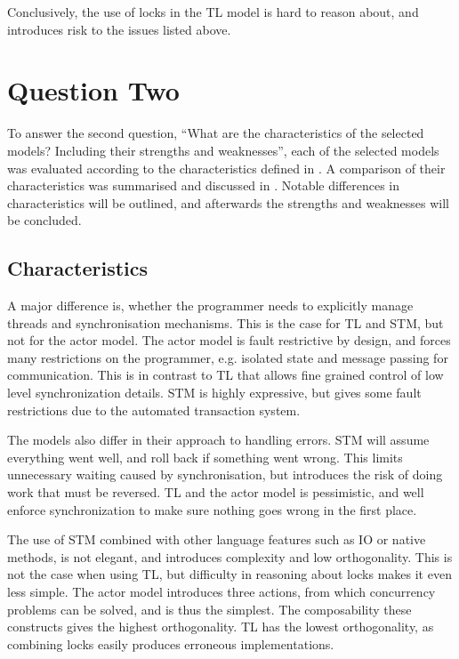 Conclusively, the use of locks in the \ac{TL} model is hard to reason about, and introduces risk to the issues listed above. 

\section{Question Two}
To answer the second question, ``What are the characteristics of the selected models? Including their strengths and weaknesses'', each of the selected models was evaluated according to the characteristics defined in . A comparison of their characteristics was summarised and discussed in . Notable differences in characteristics will be outlined, and afterwards the strengths and weaknesses will be concluded.

\subsection{Characteristics}
A major difference is, whether the programmer needs to explicitly manage threads and synchronisation mechanisms. This is the case for \ac{TL} and \ac{STM}, but not for the actor model. The actor model is fault restrictive by design, and forces many restrictions on the programmer, e.g. isolated state and message passing for communication. This is in contrast to \ac{TL} that allows fine grained control of low level synchronization details. \ac{STM} is highly expressive, but gives some fault restrictions due to the automated transaction system. 

The models also differ in their approach to handling errors. \ac{STM} will assume everything went well, and roll back if something went wrong. This limits unnecessary waiting caused by synchronisation, but introduces the risk of doing work that must be reversed. \ac{TL} and the actor model is pessimistic, and well enforce synchronization to make sure nothing goes wrong in the first place. 

The use of \ac{STM} combined with other language features such as \ac{IO} or native methods, is not elegant, and introduces complexity and low orthogonality. This is not the case when using \ac{TL}, but difficulty in reasoning about locks makes it even less simple. The actor model introduces three actions, from which concurrency problems can be solved, and is thus the simplest. The composability these constructs gives the highest orthogonality. \ac{TL} has the lowest orthogonality, as combining locks easily produces erroneous implementations.


